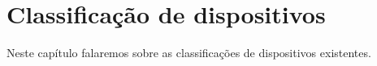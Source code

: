 \chapter{Classificação de dispositivos}

Neste capítulo falaremos sobre as classificações de dispositivos existentes.
